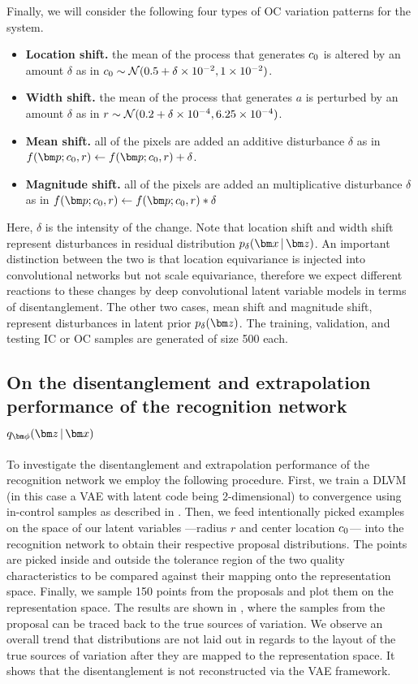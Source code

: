 \documentclass[journal, peerreview]{IEEEtran}
\begin{document}
Finally, we will consider the following four types of OC variation patterns for the system. 
\begin{itemize}
	\item \textbf{Location shift.} the mean of the process that generates $ c_{0} $ is altered by an amount $ \delta $ as in $c_{0} \sim \mathcal{N}(0.5 + \delta\times10^{-2}, 1\times10^{-2})$.
	\item \textbf{Width shift.} the mean of the process that generates $ a $ is perturbed by an amount $ \delta $ as in $r \sim \mathcal{N}(0.2+\delta\times10^{-4}, 6.25\times10^{-4})$. 
	\item \textbf{Mean shift.} all of the pixels are added an additive disturbance $ \delta $ as in $f(\mbp; c_0,r) \leftarrow f(\mbp; c_0,r) + \delta$.
	\item \textbf{Magnitude shift.} all of the pixels are added an multiplicative disturbance $ \delta $ as in $f(\mbp; c_0,r) \leftarrow f(\mbp; c_0,r) * \delta$
\end{itemize}
Here, $ \delta $ is the intensity of the change.
Note that location shift and width shift represent disturbances in residual distribution $p_{\delta}(\mbx \g \mbz)$.
An important distinction between the two is that location equivariance is injected into convolutional networks but not scale equivariance, therefore we expect different reactions to these changes by deep convolutional latent variable models in terms of disentanglement.
The other two cases, mean shift and magnitude shift, represent disturbances in latent prior $p_{\delta}(\mbz)$.
The training, validation, and testing IC or OC samples are generated of size 500 each. 

\subsection{On the disentanglement and extrapolation performance of the recognition network $\encoding$}
\label{sec:simstudy:recognition}
To investigate the disentanglement and extrapolation performance of the recognition network we employ the following procedure. 
First, we train a DLVM (in this case a VAE with latent code being 2-dimensional) to convergence using in-control samples as described in . 
Then, we feed intentionally picked examples on the space of our latent variables ---radius $r$ and center location $c_{0}$--- into the recognition network to obtain their respective proposal distributions.
The points are picked inside and outside the tolerance region of the two quality characteristics to be compared against their mapping onto the representation space.
Finally, we sample 150 points from the proposals and plot them on the representation space.
The results are shown in , where the samples from the proposal can be traced back to the true sources of variation. We observe an overall trend that distributions are not laid out in regards to the layout of the true sources of variation after they are mapped to the representation space. It shows that the disentanglement is not reconstructed via the VAE framework. 
\end{document}
